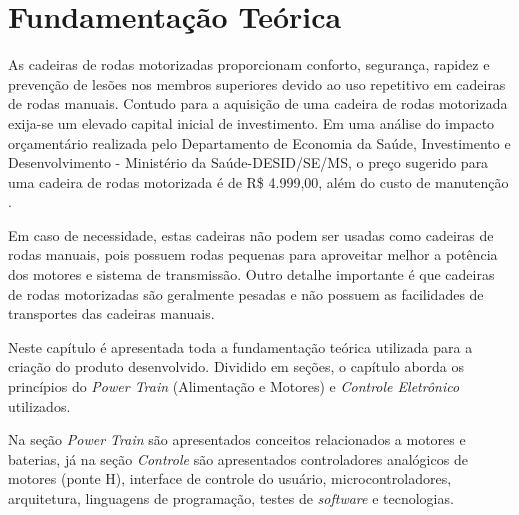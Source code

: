 \chapter{Fundamentação Teórica}
\label{cap:fundamentacao_teorica}

As cadeiras de rodas motorizadas proporcionam conforto, segurança, rapidez e prevenção de lesões nos membros superiores devido ao uso repetitivo em cadeiras de rodas manuais. Contudo para a aquisição de uma cadeira de rodas motorizada exija-se um elevado capital inicial de investimento. Em uma análise do impacto orçamentário realizada pelo Departamento de Economia da Saúde, Investimento e Desenvolvimento - Ministério da Saúde-DESID/SE/MS, o preço sugerido para uma cadeira de rodas motorizada é de R\$ 4.999,00, além do custo de manutenção \cite{relatorio_sus}.

Em caso de necessidade, estas cadeiras não podem ser usadas como cadeiras de rodas manuais, pois possuem rodas pequenas para aproveitar melhor a potência dos motores e sistema de transmissão. Outro detalhe importante é que cadeiras de rodas motorizadas são geralmente pesadas e não possuem as facilidades de transportes das cadeiras manuais.

Neste capítulo é apresentada toda a fundamentação teórica utilizada para a criação do produto desenvolvido. Dividido em seções, o capítulo aborda os princípios do \textit{Power Train} (Alimentação e Motores) e \textit{Controle Eletrônico} utilizados.

Na seção \textit{Power Train} são apresentados conceitos relacionados a motores e baterias, já na seção \textit{Controle} são apresentados controladores analógicos de motores (ponte H), interface de controle do usuário, microcontroladores, arquitetura, linguagens de programação, testes de \textit{software} e tecnologias.

